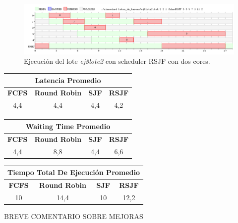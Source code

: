 \begin{figure}[!h]
	\begin{center}
		\includegraphics[width=500px]{imagenes/ej8_prueba2_rsjf2.png}
		\caption{Ejecución del lote \emph{ej8lote2} con scheduler RSJF con dos cores.}
		\label{fig:grafico_ej8_prueba2_rsjf2}
	\end{center}
\end{figure}

\begin{center}
	\begin{tabular}{|c|c|c|c|}
		\hline
		\multicolumn{4}{|c|}{\large{\textbf{Latencia Promedio}}} \\
		\hline
		\textbf{FCFS} & \textbf{Round Robin} & \textbf{SJF} & \textbf{RSJF} \\
		\hline
		4,4 & 4,4 & 4,4 & 4,2 \\
		\hline
	\end{tabular}
\end{center}

\begin{center}
	\begin{tabular}{|c|c|c|c|}
		\hline
		\multicolumn{4}{|c|}{\large{\textbf{Waiting Time Promedio}}} \\
		\hline
		\textbf{FCFS} & \textbf{Round Robin} & \textbf{SJF} & \textbf{RSJF} \\
		\hline
		4,4 & 8,8 & 4,4 & 6,6 \\
		\hline
	\end{tabular}
\end{center}

\begin{center}
	\begin{tabular}{|c|c|c|c|}
		\hline
		\multicolumn{4}{|c|}{\large{\textbf{Tiempo Total De Ejecución Promedio}}} \\
		\hline
		\textbf{FCFS} & \textbf{Round Robin} & \textbf{SJF} & \textbf{RSJF} \\
		\hline
		10 & 14,4 & 10 & 12,2 \\
		\hline
	\end{tabular}
\end{center}

BREVE COMENTARIO SOBRE MEJORAS
